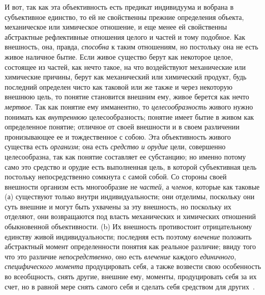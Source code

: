 \documentclass[twoside]{article}
\begin{document}
{{{И вот, так как эта объективность есть предикат индивидуума и
вобрана в субъективное единство, то ей не свойственны прежние определения
объекта, механическое или химическое отношение, и еще менее ей свойственны
абстрактные рефлективные отношения целого и частей и тому подобное. Как
внешность, она, правда, {\em способна}
к таким отношениям, но постольку она не есть живое наличное
бытие. Если живое существо берут как некоторое целое, состоящее из частей,
как нечто такое, на что воздействуют механические или химические причины,
берут как механический или химический продукт, будь последний определен
чисто как таковой или же также и через некоторую внешнюю
цель, то понятие становится внешним ему, живое берется как нечто
{\em мертвое}. Так как
понятие ему имманентно, то
{\em целесообразность}
живого нужно понимать как
{\em внутреннюю}
целесообразность; понятие имеет бытие в живом как
определенное понятие; отличное от своей внешности и в своем различении
пронизывающее ее и тождественное с собою. Эта объективность живого существа
есть {\em организм}; она
есть {\em средство и орудие}
цели, совершенно целесообразна, так как понятие составляет ее
субстанцию; но именно потому само это средство и орудие есть выполненная
цель, в которой субъективная цель постольку непосредственно сомкнута с
самой собой. Со стороны своей внешности организм есть многообразие не
{\em частей}, а
{\em членов}, которые как
таковые (а) существуют только внутри индивидуальности; они отделимы,
поскольку они суть внешние и могут быть ухвачены за эту внешность, но
поскольку их отделяют, они возвращаются под власть механических и
химических отношений обыкновенной объективности. (b) Их внешность
противостоит отрицательному единству живой индивидуальности; последняя есть
поэтому {\em влечение}
положить абстрактный момент определенности понятия как
реальное различие; ввиду того что это различие
{\em непосредственно},
оно есть {\em влечение}
каждого {\em единичного},
{\em специфического момента}
продуцировать себя, а также возвести свою особенность во
всеобщность, снять другие, внешние ему, моменты, продуцировать себя за их
счет, но в равной мере снять самого себя и сделать себя средством для
других~\label{bkm:bm94}.

}}}
\end{document}

